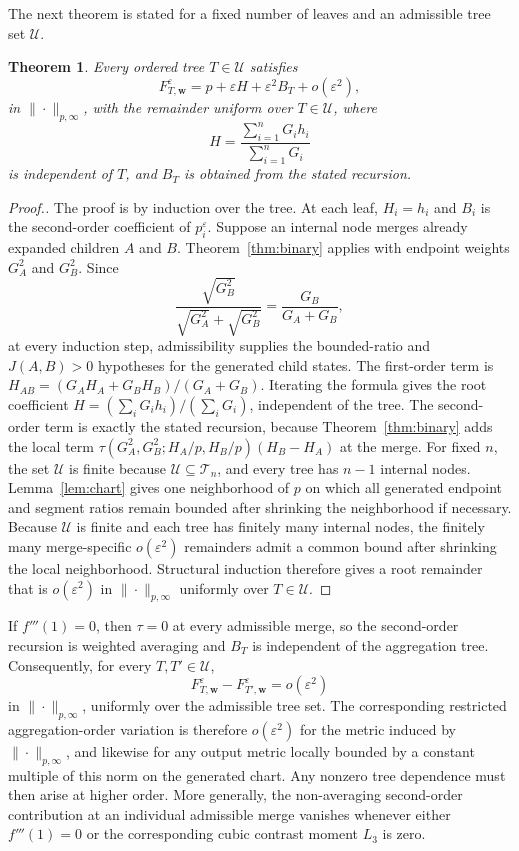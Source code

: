 \documentclass[11pt]{article}
\theoremstyle{plain}
\newtheorem{theorem}{Theorem}
\theoremstyle{definition}
\theoremstyle{definition}
\newcommand{\BT}{\mathcal T}
\newcommand{\eps}{\varepsilon}
\newcommand{\wv}{\mathbf w}
\newcommand{\Fw}[1]{F_{#1,\wv}^{\eps}}
\begin{document}
The next theorem is stated for a fixed number of leaves and an admissible tree set $\mathcal U$.

\begin{theorem}\label{thm:tree}
Every ordered tree $T\in\mathcal U$ satisfies
\[
\Fw{T}=p+\eps H+\eps^2B_T+o(\eps^2),
\]
in $\|\cdot\|_{p,\infty}$, with the remainder uniform over $T\in\mathcal U$,
where
\[
H=\frac{\sum_{i=1}^nG_ih_i}{\sum_{i=1}^nG_i}
\]
is independent of $T$, and $B_T$ is obtained from the stated recursion.
\end{theorem}

\begin{proof}[Proof.]
The proof is by induction over the tree. At each leaf, $H_i=h_i$ and $B_i$ is the second-order coefficient of $p_i^\eps$. Suppose an internal node merges already expanded children $A$ and $B$. Theorem~\ref{thm:binary} applies with endpoint weights $G_A^2$ and $G_B^2$. Since
\[
\frac{\sqrt{G_B^2}}{\sqrt{G_A^2}+\sqrt{G_B^2}}=\frac{G_B}{G_A+G_B},
\]
at every induction step, admissibility supplies the bounded-ratio and $J(A,B)>0$ hypotheses for the generated child states.
The first-order term is $H_{AB}=(G_AH_A+G_BH_B)/(G_A+G_B)$. Iterating the formula gives the root coefficient $H=(\sum_iG_ih_i)/(\sum_iG_i)$, independent of the tree. The second-order term is exactly the stated recursion, because Theorem~\ref{thm:binary} adds the local term $\tau(G_A^2,G_B^2;H_A/p,H_B/p)(H_B-H_A)$ at the merge. For fixed $n$, the set $\mathcal U$ is finite because $\mathcal U\subseteq\BT_n$, and every tree has $n-1$ internal nodes. Lemma~\ref{lem:chart} gives one neighborhood of $p$ on which all generated endpoint and segment ratios remain bounded after shrinking the neighborhood if necessary. Because $\mathcal U$ is finite and each tree has finitely many internal nodes, the finitely many merge-specific $o(\eps^2)$ remainders admit a common bound after shrinking the local neighborhood. Structural induction therefore gives a root remainder that is $o(\eps^2)$ in $\|\cdot\|_{p,\infty}$ uniformly over $T\in\mathcal U$.
\end{proof}

If $f'''(1)=0$, then $\tau=0$ at every admissible merge, so the second-order recursion is weighted averaging and $B_T$ is independent of the aggregation tree. Consequently, for every $T,T'\in\mathcal U$,
\[
\Fw{T}-\Fw{T'}=o(\eps^2)
\]
in $\|\cdot\|_{p,\infty}$, uniformly over the admissible tree set. The corresponding restricted aggregation-order variation is therefore $o(\eps^2)$ for the metric induced by $\|\cdot\|_{p,\infty}$, and likewise for any output metric locally bounded by a constant multiple of this norm on the generated chart. Any nonzero tree dependence must then arise at higher order. More generally, the non-averaging second-order contribution at an individual admissible merge vanishes whenever either $f'''(1)=0$ or the corresponding cubic contrast moment $L_3$ is zero.
\end{document}

